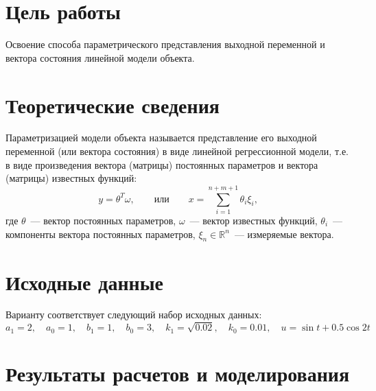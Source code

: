 \section{Цель работы}
Освоение способа параметрического представления выходной переменной и вектора состояния линейной модели объекта.


\section{Теоретические сведения}
Параметризацией модели объекта называется представление его выходной переменной (или вектора состояния) в виде линейной регрессионной модели, т.е. в виде произведения вектора (матрицы) постоянных параметров и вектора (матрицы) известных функций:
\begin{equation}
    y = \theta^T \omega,
    \qquad
    \text{или}
    \qquad
    x = \!\!\! \sum_{i=1}^{n+m+1} \!\! \theta_i \xi_i,
\end{equation}
где $\theta$~--- вектор постоянных параметров, $\omega$~--- вектор известных функций, $\theta_i$~--- компоненты вектора постоянных параметров, $\xi_n \in \mathbb{R}^n$~--- измеряемые вектора.

\section{Исходные данные}
Варианту  соответствует следующий набор исходных данных:
\begin{equation}
    a_1 = 2,
    \quad
    a_0 = 1,
    \quad
    b_1 = 1,
    \quad
    b_0 = 3,
    \quad
    k_1 = \sqrt{0.02},
    \quad
    k_0 = 0.01,
    \quad
    u = \sin{t} + 0.5 \cos{2t}
\end{equation}


\section{Результаты расчетов и моделирования}
